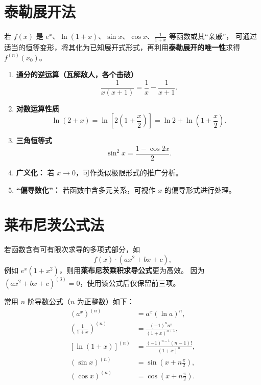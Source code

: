 
\section{泰勒展开法}
\DTwoThree

若 $f(x)$ 是 $e^x$、$\ln(1+x)$、$\sin x$、$\cos x$、$\frac{1}{1+x}$ 等函数或其“亲戚”，
可通过适当的恒等变形，将其化为已知展开式形式，再利用\textbf{泰勒展开的唯一性}求得 $f^{(n)}(x_0)$。

\begin{enumerate}
    \item \textbf{通分的逆运算（瓦解敌人，各个击破）}
          \[
              \frac{1}{x(x+1)} = \frac{1}{x} - \frac{1}{x+1}.
          \]

    \item \textbf{对数运算性质}
          \[
              \ln(2+x) = \ln\!\left[2\!\left(1+\frac{x}{2}\right)\right]
              = \ln 2 + \ln\!\left(1+\frac{x}{2}\right).
          \]

    \item \textbf{三角恒等式}
          \[
              \sin^2 x = \frac{1-\cos 2x}{2}.
          \]

    \item \textbf{广义化：} 若 $x \to 0$，可作类似极限形式的推广分析。

    \item \textbf{“偏导数化”：} 若函数中含多元关系，可视作 $x$ 的偏导形式进行处理。
\end{enumerate}

\section{莱布尼茨公式法}
\DTwoThree

若函数含有可有限次求导的多项式部分，如
\[
    f(x)\cdot (a x^2 + b x + c),
\]
例如 $e^x(1+x^2)$，则用\textbf{莱布尼茨乘积求导公式}更为高效。
因为 $(a x^2 + b x + c)^{(3)} = 0$，使用该公式后仅保留前三项。

常用 $n$ 阶导数公式（$n$ 为正整数）如下：
\[
    \begin{aligned}
        (a^x)^{(n)}                      & = a^x (\ln a)^n,                       \\
        \left(\frac{1}{1+x}\right)^{(n)} & = \frac{(-1)^n n!}{(1+x)^{n+1}},       \\
        [\ln(1+x)]^{(n)}                 & = \frac{(-1)^{n-1}(n-1)!}{(1+x)^n},    \\
        (\sin x)^{(n)}                   & = \sin\!\left(x+n\frac{\pi}{2}\right), \\
        (\cos x)^{(n)}                   & = \cos\!\left(x+n\frac{\pi}{2}\right).
    \end{aligned}
\]

